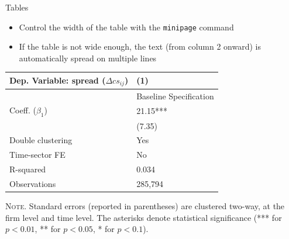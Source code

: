 \documentclass[10pt,itemsep]{beamer}
\begin{document}
\begin{frame}
    {Tables}
    \begin{itemize}
        \item Control the width of the table with the \texttt{minipage} command
        \item If the table is not wide enough, the text (from column 2 onward) is automatically spread on multiple lines
    \end{itemize}
    \begin{table}[th]
        \centering%
        \begin{minipage}[b]{.4\textwidth}
            \vspace{.2cm}\tablesize
            \begin{tabularx}{\textwidth}{lY}
                \toprule
                Dep. Variable: spread ($\Delta cs_{ij}$) 	& (1)\\
                \midrule
                & {Baseline Specification} \\
                \midrule
                 Coeff. ($\beta_1$) 		&  21.15*** \\
                &   (7.35) \\
                \midrule
                 Double clustering 		& Yes \\
                Time-sector FE 												& No \\
                 R-squared 					& 0.034 \\
                Observations 												& 285,794 \\\bottomrule
            \end{tabularx}\vspace{.2cm}\newline
            \tiny{{\scshape Note.} Standard errors (reported in parentheses) are clustered two-way, at the firm level and time level. The asterisks denote statistical significance (*** for $p<0.01$, ** for $p<0.05$, * for $p<0.1$).\newline}%
            \label{tab:label4}%
        \end{minipage}
    \end{table}
\end{frame}
\shownotesblock{}
\end{document}
